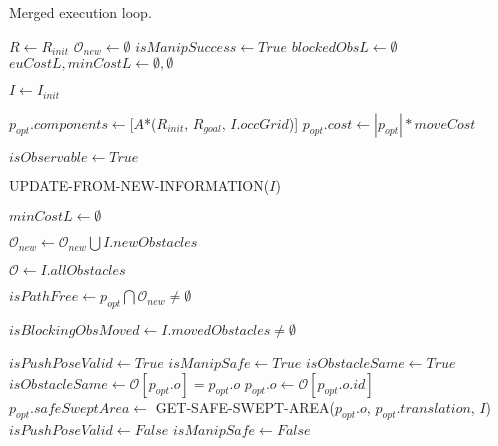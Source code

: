 \begin{algorithm}[H]

  \caption{Merged execution loop.}

  \label{alg:07-custom-merge-makeandexecuteplan-part1}

  \begin{algorithmic}[1]


      \State $R \gets R_{init}$
      \State $\mathcal{O}_{new} \gets \emptyset$
      \State $isManipSuccess \gets True$
      \State $blockedObsL \gets \emptyset$
      \State $euCostL, minCostL \gets \emptyset, \emptyset$

      \State $I \gets I_{init}$

      \State $p_{opt}.components \gets [$$A$*($R_{init}$, $R_{goal}$, $I.occGrid$)]
      \State $p_{opt}.cost \gets |p_{opt}| * moveCost$

      \State $isObservable \gets True$


        \State UPDATE-FROM-NEW-INFORMATION($I$)

          \State $minCostL \gets \emptyset$
        \EndIf

        \State $\mathcal{O}_{new} \gets \mathcal{O}_{new} \bigcup I.newObstacles$

        \State $\mathcal{O} \gets I.allObstacles$

        \State $isPathFree \gets p_{opt} \bigcap \mathcal{O}_{new} \neq \emptyset$

        \State $isBlockingObsMoved \gets I.movedObstacles \neq \emptyset$

        \State $isPushPoseValid \gets True$
        \State $isManipSafe \gets True$
        \State $isObstacleSame \gets True$
          \State $isObstacleSame \gets \mathcal{O}[p_{opt}.o] = p_{opt}.o$
            \State $p_{opt}.o \gets \mathcal{O}[p_{opt}.o.id]$
            \State $p_{opt}.safeSweptArea \gets$ GET-SAFE-SWEPT-AREA($p_{opt}.o$, $p_{opt}.translation$, $I$)
              \State $isPushPoseValid \gets False$
            \EndIf
          \EndIf
            \State $isManipSafe \gets False$
          \EndIf
        \EndIf


\end{algorithmic}
\end{algorithm}
